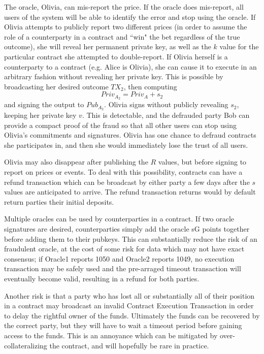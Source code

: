 \documentclass[11pt]{article}
\begin{document}
The oracle, Olivia, can mis-report the price.  If the oracle does mis-report, all users of the system will be able to identify the error and stop using the oracle.  If Olivia attempts to publicly report two different prices (in order to assume the role of a counterparty in a contract and ``win" the bet regardless of the true outcome), she will reveal her permanent private key, as well as the \(k\) value for the particular contract she attempted to double-report.
If Olivia herself is a counterparty to a contract (e.g. Alice is Olivia), she can cause it to execute in an arbitrary fashion without revealing her private key.  This is possible by broadcasting her desired outcome \(TX_{2}\), then computing 
\[Priv_{A_2} =  Priv_{A} + s_{2}\]
and signing the output to \(Pub_{A_2}\).  Olivia signs without publicly revealing \(s_2\), keeping her private key \(v\).  This is detectable, and the defrauded party Bob can provide a compact proof of the fraud so that all other users can stop using Olivia's commitments and signatures.  Olivia has one chance to defraud contracts she participates in, and then she would immediately lose the trust of all users.

Olivia may also disappear after publishing the \(R\) values, but before signing to report on prices or events.  To deal with this possibility, contracts can have a refund transaction which can be broadcast by either party a few days after the \(s\) values are anticipated to arrive.  The refund transaction returns would by default return parties their initial deposits.


Multiple oracles can be used by counterparties in a contract.  If two oracle signatures are desired, counterparties simply add the oracle sG points together before adding them to their pubkeys.  This can substantially reduce the risk of an fraudulent oracle, at the cost of some risk for data which may not have exact consensus; if Oracle1 reports 1050 and Oracle2 reports 1049, no execution transaction may be safely used and the pre-arraged timeout transaction will eventually become valid, resulting in a refund for both parties.

Another risk is that a party who has lost all or substantially all of their position in a contract may broadcast an invalid Contract Execution Transaction in order to delay the rightful owner of the funds.  Ultimately the funds can be recovered by the correct party, but they will have to wait a timeout period before gaining access to the funds.  This is an annoyance which can be mitigated by over-collateralizing the contract, and will hopefully be rare in practice.
\end{document}
